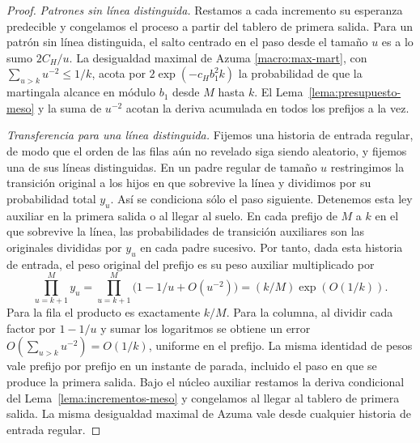 \begin{proof}
\emph{Patrones sin línea distinguida.} Restamos a cada incremento su esperanza predecible y congelamos
el proceso a partir del tablero de
primera salida. Para un patrón sin línea distinguida, el salto centrado en el paso desde el tamaño
$u$ es a lo sumo $2C_H/u$. La desigualdad maximal de Azuma \eqref{macro:max-mart}, con
$\sum_{u>k}u^{-2}\le1/k$, acota por $2\exp(-c_H b_1^2k)$ la probabilidad de que la martingala alcance
en módulo $b_1$ desde $M$ hasta $k$. El
Lema~\ref{lema:presupuesto-meso} y la suma de $u^{-2}$ acotan la deriva acumulada en todos los
prefijos a la vez.

\emph{Transferencia para una línea distinguida.} Fijemos una historia de entrada regular, de modo
que el orden de las filas aún no revelado siga
siendo aleatorio, y fijemos una de sus líneas distinguidas. En un padre regular de tamaño $u$
restringimos la transición original a los hijos en que sobrevive la línea y dividimos por su
probabilidad total $y_u$. Así se condiciona sólo el paso siguiente. Detenemos esta ley auxiliar en la
primera salida o al llegar al suelo. En cada prefijo de $M$ a $k$ en el que sobrevive la línea,
las probabilidades de transición auxiliares son las originales divididas por $y_u$ en cada padre
sucesivo. Por tanto, dada esta historia de entrada, el peso original del prefijo es su peso auxiliar
multiplicado por
\[
 \prod_{u=k+1}^{M}y_u
 =\prod_{u=k+1}^{M}\big(1-1/u+O(u^{-2})\big)
 =(k/M)\exp(O(1/k)).
\]
Para la fila el producto es exactamente $k/M$. Para la columna, al dividir cada factor por $1-1/u$
y sumar los logaritmos se obtiene un error $O(\sum_{u>k}u^{-2})=O(1/k)$, uniforme en el prefijo.
La misma identidad de pesos vale prefijo por prefijo en un instante de parada, incluido el paso en que
se produce la primera salida. Bajo el núcleo auxiliar restamos la
deriva condicional del Lema~\ref{lema:incrementos-meso} y congelamos al llegar al tablero de primera
salida. La
misma desigualdad maximal de Azuma vale desde cualquier historia de entrada regular.


\end{proof}
